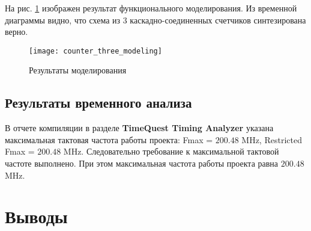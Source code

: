 На рис. \ref{fig:counter_three_modeling} изображен результат функционального моделирования. Из временной диаграммы видно, что схема из 3 каскадно-соединенных счетчиков синтезирована верно.

\begin{figure}[H]
\begin{center}
	\texttt{[image: counter\_three\_modeling]}
	\caption{Результаты моделирования}
	\label{fig:counter_three_modeling}
\end{center}
\end{figure}

\subsection{Результаты временного анализа}

В отчете компиляции в разделе \textbf{TimeQuest Timing Analyzer} указана максимальная тактовая частота работы проекта: Fmax = $200.48$ MHz, Restricted Fmax = $200.48$ MHz. Следовательно требование к максимальной тактовой частоте выполнено. При этом максимальная частота работы проекта равна $200.48$ MHz.

\section{Выводы}


